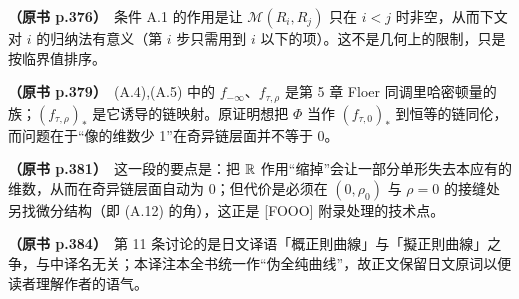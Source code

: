 \noindent \textbf{（原书 p.376）}\ 条件 A.1 的作用是让 $\mathcal{M}(R_i,R_j)$ 只在 $i<j$ 时非空，从而下文对 $i$ 的归纳法有意义（第 $i$ 步只需用到 $i$ 以下的项）。这不是几何上的限制，只是按临界值排序。\par\smallskip

\noindent \textbf{（原书 p.379）}\ (A.4),(A.5) 中的 $f_{-\infty}$、$f_{\tau,\rho}$ 是第 5 章 Floer 同调里哈密顿量的族；$(f_{\tau,\rho})_*$ 是它诱导的链映射。原证明想把 $\Phi$ 当作 $(f_{\tau,0})_*$ 到恒等的链同伦，而问题在于“像的维数少 1”在奇异链层面并不等于 $0$。\par\smallskip

\noindent \textbf{（原书 p.381）}\ 这一段的要点是：把 $\mathbb{R}$ 作用“缩掉”会让一部分单形失去本应有的维数，从而在奇异链层面自动为 $0$；但代价是必须在 $(0,\rho_0)$ 与 $\rho=0$ 的接缝处另找微分结构（即 (A.12) 的角），这正是 [FOOO] 附录处理的技术点。\par\smallskip

\noindent \textbf{（原书 p.384）}\ 第 11 条讨论的是日文译语「概正則曲線」与「擬正則曲線」之争，与中译名无关；本译注本全书统一作“伪全纯曲线”，故正文保留日文原词以便读者理解作者的语气。\par\smallskip

